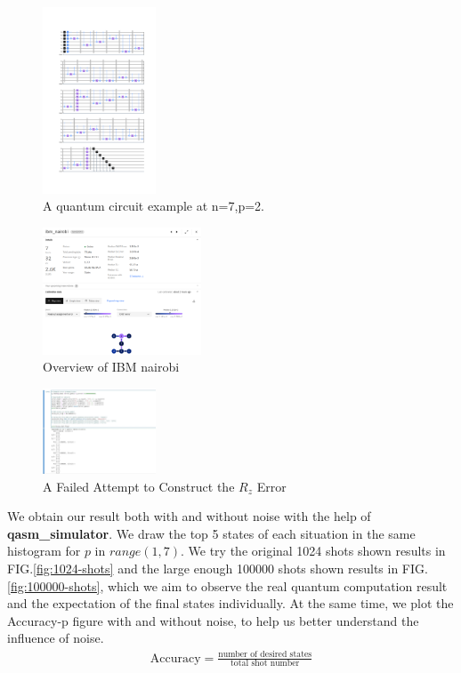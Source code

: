 \begin{figure}[!htb]
    \centering
    \includegraphics[width=0.3\textwidth]{circuit.png}
    \caption{A quantum circuit example at n=7,p=2.}
    \label{fig:example circuit}
\end{figure}

\begin{figure}[!htb]
    \centering
    \includegraphics[width=0.42\textwidth]{overview of ibm_nairobi.png}
    \caption{Overview of IBM nairobi}
    \label{fig:overview of ibm_nairobi}
\end{figure}

\begin{figure}[!htb]
    \centering
    \includegraphics[width=0.3\textwidth]{failure.jpg}
    \caption{A Failed Attempt to Construct the $R_z$ Error}
    \label{fig:failure}
\end{figure}

We obtain our result both with and without noise with the help of \textbf{qasm\_simulator}. We draw the top 5 states of each situation in the same histogram for $p$ in $range(1,7)$. We try the original 1024 shots shown results in FIG.\ref{fig:1024-shots} and the large enough 100000 shots  shown results in FIG.\ref{fig:100000-shots}, which we aim to observe the real quantum computation result and the expectation of the final states individually. At the same time, we plot the Accuracy-p figure with and without noise, to help us better understand the influence of noise. 
\begin{align*}
    \text{Accuracy}=\frac{\text{number of desired states}}{\text{total shot number}}
\end{align*}

